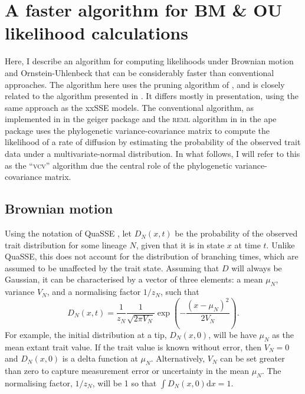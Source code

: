 \documentclass[12pt,twoside]{article}
\newcommand{\dnorm}[3]{%
  \frac{1}{\sqrt{2\pi #3}} 
  \exp\left(-\frac{(#1-#2)^2}{2#3}\right)
}
\newcommand{\ud}{\ensuremath{\mathrm{d}}}
\begin{document}
\clearpage
\section{A faster algorithm for BM \& OU likelihood calculations}
\label{sec:bm-ou}

Here, I describe an algorithm for computing likelihoods under Brownian
motion and Ornstein-Uhlenbeck that can be considerably faster than
conventional approaches.
%
The algorithm here uses the pruning algorithm of
\citet{Felsenstein-1981-368}, and is closely related to the algorithm
presented in \citet{Felsenstein-1973-471}.  It differs mostly in
presentation, using the same approach as the xxSSE models.
%
The conventional algorithm, as implemented in  in
the geiger package \citep{geiger} and the \textsc{reml} algorithm in
 in the ape package \citep{ape} uses the phylogenetic
variance-covariance matrix to compute the likelihood of a rate of
diffusion by estimating the probability of the observed trait data
under a multivariate-normal distribution.  In what follows, I will
refer to this as the ``\textsc{vcv}'' algorithm due the central role
of the phylogenetic variance-covariance matrix.

\subsection{Brownian motion}

Using the notation of QuaSSE \citep{FitzJohn-2010-619}, let $D_N(x,t)$
be the probability of the observed trait distribution for some lineage
$N$, given that it is in state $x$ at time $t$.  Unlike QuaSSE, this
does not account for the distribution of branching times, which are
assumed to be unaffected by the trait state.  Assuming that $D$ will
always be Gaussian, it can be characterised by a vector of three
elements: a mean $\mu_N$, variance $V_N$, and a normalising factor
$1/z_N$, such that
\begin{equation}
  \label{eq:Gaussian}
  D_N(x,t) = \frac{1}{z_N}\dnorm{x}{\mu_N}{V_N}.
\end{equation}
For example, the initial distribution at a tip, $D_N(x,0)$, will be
have $\mu_N$ as the mean extant trait value.  If the trait value is
known without error, then $V_N=0$ and $D_N(x,0)$ is a delta function
at $\mu_N$.  Alternatively, $V_N$ can be set greater than zero to
capture measurement error or uncertainty in the mean $\mu_N$.  The
normalising factor, $1/z_N$, will be 1 so that $\int D_N(x,0)\ud x =
1$.
\end{document}
